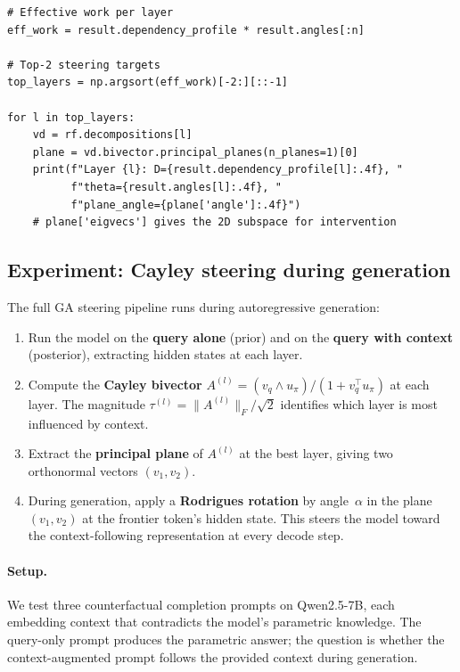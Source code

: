 \documentclass[11pt, twoside, openright]{memoir}
\newcommand{\op}{\wedge}          %
\numberwithin{equation}{chapter}
\begin{document}
\begin{lstlisting}[caption={Identifying steering targets}]
# Effective work per layer
eff_work = result.dependency_profile * result.angles[:n]

# Top-2 steering targets
top_layers = np.argsort(eff_work)[-2:][::-1]

for l in top_layers:
    vd = rf.decompositions[l]
    plane = vd.bivector.principal_planes(n_planes=1)[0]
    print(f"Layer {l}: D={result.dependency_profile[l]:.4f}, "
          f"theta={result.angles[l]:.4f}, "
          f"plane_angle={plane['angle']:.4f}")
    # plane['eigvecs'] gives the 2D subspace for intervention
\end{lstlisting}

\subsection{Experiment: Cayley steering during generation}

The full GA steering pipeline runs during autoregressive generation:
\begin{enumerate}[nosep]
\item Run the model on the \textbf{query alone} (prior) and on the
  \textbf{query with context} (posterior), extracting hidden states at
  each layer.
\item Compute the \textbf{Cayley bivector}
  $A^{(l)} = (v_q \op u_\pi) / (1 + v_q^\top u_\pi)$ at each layer.
  The magnitude $\tau^{(l)} = \|A^{(l)}\|_F / \sqrt{2}$ identifies which layer is
  most influenced by context.
\item Extract the \textbf{principal plane} of $A^{(l)}$ at the
  best layer, giving two orthonormal vectors $(v_1, v_2)$.
\item During generation, apply a \textbf{Rodrigues rotation} by
  angle~$\alpha$ in the plane $(v_1, v_2)$ at the frontier token's
  hidden state.  This steers the model toward the context-following
  representation at every decode step.
\end{enumerate}

\paragraph{Setup.}
We test three counterfactual completion prompts on Qwen2.5-7B, each
embedding context that contradicts the model's parametric knowledge.
The query-only prompt produces the parametric answer; the question is
whether the context-augmented prompt follows the provided context
during generation.
\end{document}
